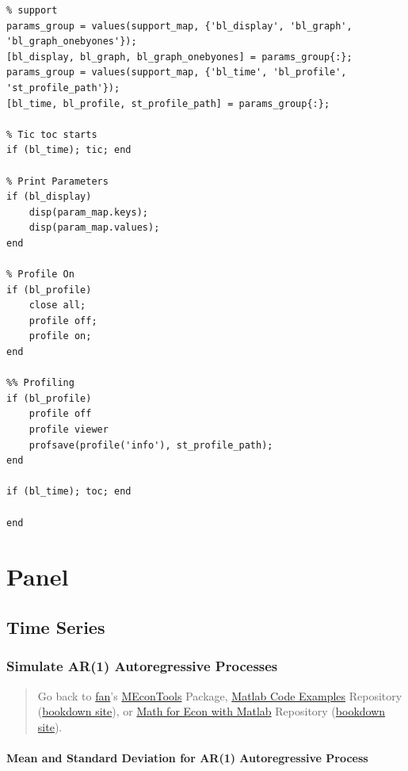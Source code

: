 \documentclass[
]{book}
\begin{document}
\begin{verbatim}
% support
params_group = values(support_map, {'bl_display', 'bl_graph', 'bl_graph_onebyones'});
[bl_display, bl_graph, bl_graph_onebyones] = params_group{:};
params_group = values(support_map, {'bl_time', 'bl_profile', 'st_profile_path'});
[bl_time, bl_profile, st_profile_path] = params_group{:};

% Tic toc starts
if (bl_time); tic; end

% Print Parameters
if (bl_display)
    disp(param_map.keys);
    disp(param_map.values);
end

% Profile On
if (bl_profile)
    close all;
    profile off;
    profile on;
end

%% Profiling
if (bl_profile)
    profile off
    profile viewer
    profsave(profile('info'), st_profile_path);
end

if (bl_time); toc; end

end
\end{verbatim}

\hypertarget{panel}{%
\chapter{Panel}\label{panel}}

\hypertarget{time-series}{%
\section{Time Series}\label{time-series}}

\hypertarget{simulate-ar1-autoregressive-processes}{%
\subsection{Simulate AR(1) Autoregressive Processes}\label{simulate-ar1-autoregressive-processes}}

\begin{quote}
Go back to \href{http://fanwangecon.github.io/}{fan}'s \href{https://fanwangecon.github.io/MEconTools/}{MEconTools} Package, \href{https://fanwangecon.github.io/M4Econ/}{Matlab Code Examples} Repository (\href{https://fanwangecon.github.io/M4Econ/bookdown}{bookdown site}), or \href{https://fanwangecon.github.io/Math4Econ/}{Math for Econ with Matlab} Repository (\href{https://fanwangecon.github.io/Math4Econ/bookdown}{bookdown site}).
\end{quote}

\hypertarget{mean-and-standard-deviation-for-ar1-autoregressive-process}{%
\subsubsection{Mean and Standard Deviation for AR(1) Autoregressive Process}\label{mean-and-standard-deviation-for-ar1-autoregressive-process}}
\end{document}
